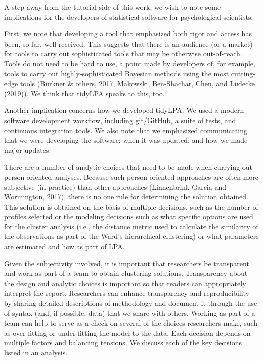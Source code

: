 \documentclass[man]{apa6}
\begin{document}
A step away from the tutorial side of this work, we wish to note some
implications for the developers of statistical software for psychological
scientists.

First, we note that developing a tool that emphasized both rigor and access has
been, so far, well-received. This suggests that there is an audience (or a
market) for tools to carry out sophisticated tools that may be otherwise
out-of-reach. Tools do not need to be hard to use, a point made by developers
of, for example, tools to carry out highly-sophisticated Bayesian methods using
the most cutting-edge tools (Bürkner \& others, 2017, Makowski, Ben-Shachar, Chen, and Lüdecke (2019)). We think that
tidyLPA speaks to this, too.

Another implication concerns how we developed tidyLPA. We used a modern software
development workflow, including git/GitHub, a suite of tests, and continuous
integration tools. We also note that we emphasized communicating that we were
developing the software; when it was updated; and how we made major updates.

There are a number of analytic choices that need to be made when carrying out
person-oriented analyses. Because such person-oriented approaches are often more
subjective (in practice) than other approaches (Linnenbrink-Garcia and
Wormington, 2017), there is no one rule for determining the solution obtained.
This solution is obtained on the basis of multiple decisions, such as the number
of profiles selected or the modeling decisions such as what specific options are
used for the cluster analysis (i.e., the distance metric used to calculate the
similarity of the observations as part of the Ward's hierarchical clustering) or
what parameters are estimated and how as part of LPA.

Given the subjectivity involved, it is important that researchers be transparent
and work as part of a team to obtain clustering solutions. Transparency about
the design and analytic choices is important so that readers can appropriately
interpret the report. Researchers can enhance transparency and reproducibility
by sharing detailed descriptions of methodology and document it through the use
of syntax (and, if possible, data) that we share with others. Working as part of
a team can help to serve as a check on several of the choices researchers make,
such as over-fitting or under-fitting the model to the data. Each decision
depends on multiple factors and balancing tensions. We discuss each of the key
decisions listed in an analysis.
\end{document}
